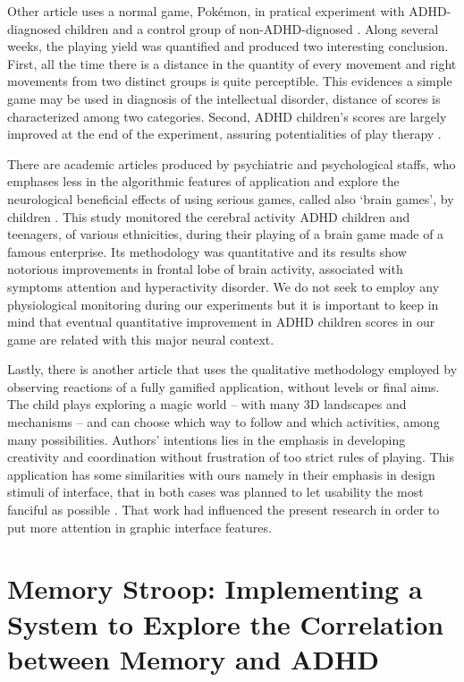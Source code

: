Other article uses a normal game, Pok\'{e}mon, in pratical experiment with ADHD-diagnosed children and a control group of non-ADHD-dignosed \citep{ADHDGames}. Along several weeks, the playing yield was quantified and produced two interesting conclusion. First, all the time there is a distance in the quantity of every movement and right movements from two distinct groups is quite perceptible. This evidences a simple game may be used in diagnosis of the intellectual disorder, distance of scores is characterized among two categories. Second, ADHD children's scores are largely improved at the end of the experiment, assuring potentialities of play therapy \citep{ADHDGames}.



There are academic articles produced by psychiatric and psychological staffs, who emphases less in the algorithmic features of application and explore the neurological beneficial effects of using serious games, called also `brain games', by children \citep{brainGames}. This study monitored the cerebral activity ADHD children and teenagers, of various ethnicities, during their playing of a brain game made of a famous enterprise. Its methodology was quantitative and its results show notorious improvements in frontal lobe of brain activity, associated with symptoms attention and hyperactivity disorder. We do not seek to employ any physiological monitoring during our experiments but it is important to keep in mind that eventual quantitative improvement in ADHD children scores in our game are related with this major neural context. 



Lastly, there is another article \citep{design} that uses the qualitative methodology employed by observing reactions of a fully gamified application, without levels or final aims. The child plays exploring a magic world -- with many 3D landscapes and mechanisms -- and can choose which way to follow and which activities, among many possibilities. Authors' intentions lies in the emphasis in developing creativity and coordination without frustration of too strict rules of playing. This application has some similarities with ours namely in their emphasis in design stimuli of interface, that in both cases was planned to let usability the most fanciful as possible \citep{design}. That work had influenced the present research in order to put more attention in graphic interface features.



\section{Memory Stroop: Implementing a System to Explore the Correlation between Memory and ADHD}



